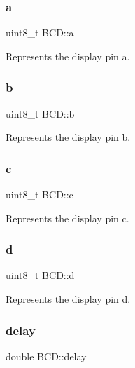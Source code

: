 \subsubsection{\texorpdfstring{a}{a}}
{\footnotesize\ttfamily uint8\+\_\+t B\+C\+D\+::a}



Represents the display pin \textquotesingle{}a\textquotesingle{}. 

\mbox{\label{structBCD_ad0a5d9e51ea7e8cc105a6d02cec8b60b}} 
\subsubsection{\texorpdfstring{b}{b}}
{\footnotesize\ttfamily uint8\+\_\+t B\+C\+D\+::b}



Represents the display pin \textquotesingle{}b\textquotesingle{}. 

\mbox{\label{structBCD_a888d1510f4c5b6cf0957d3794cdf1941}} 
\subsubsection{\texorpdfstring{c}{c}}
{\footnotesize\ttfamily uint8\+\_\+t B\+C\+D\+::c}



Represents the display pin \textquotesingle{}c\textquotesingle{}. 

\mbox{\label{structBCD_ac2e48667814cb2c29e02019592e7368f}} 
\subsubsection{\texorpdfstring{d}{d}}
{\footnotesize\ttfamily uint8\+\_\+t B\+C\+D\+::d}



Represents the display pin \textquotesingle{}d\textquotesingle{}. 

\mbox{\label{structBCD_a4575c9325254534125fadd7d32061f57}} 
\subsubsection{\texorpdfstring{delay}{delay}}
{\footnotesize\ttfamily double B\+C\+D\+::delay}



